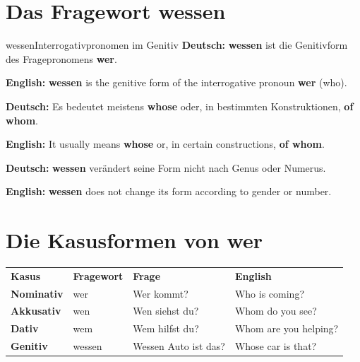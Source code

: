 \documentclass[a4paper,11pt]{article}
\newcommand{\GermanText}[1]{\textbf{Deutsch: }#1\par}
\newcommand{\EnglishText}[1]{{\small\color{SoftGray}\textbf{English: }#1\par}}
\begin{document}
    
    \section{Das Fragewort \glqq wessen\grqq}
        
        \begin{grammarentry}{wessen}{Interrogativpronomen im Genitiv}
            \GermanText{\textbf{wessen} ist die Genitivform des Fragepronomens \textbf{wer}.}
            \EnglishText{\textbf{wessen} is the genitive form of the interrogative pronoun \textbf{wer} (who).}
            
            \GermanText{Es bedeutet meistens \textbf{whose} oder, in bestimmten Konstruktionen, \textbf{of whom}.}
            \EnglishText{It usually means \textbf{whose} or, in certain constructions, \textbf{of whom}.}
            
            \GermanText{\textbf{wessen} verändert seine Form nicht nach Genus oder Numerus.}
            \EnglishText{\textbf{wessen} does not change its form according to gender or number.}
        \end{grammarentry}
    
    
    \section{Die Kasusformen von \glqq wer\grqq}
        
        \begin{longtable}{>{\bfseries}p{3.2cm}|p{3.0cm}|p{4.5cm}|p{3.2cm}}
            \rowcolor{HeaderBlueDark}
            \color{white}\textbf{Kasus} &
            \color{white}\textbf{Fragewort} &
            \color{white}\textbf{Frage} &
            \color{white}\textbf{English} \\
            
            Nominativ &
            wer &
            Wer kommt? &
            Who is coming? \\
            
            Akkusativ &
            wen &
            Wen siehst du? &
            Whom do you see? \\
            
            Dativ &
            wem &
            Wem hilfst du? &
            Whom are you helping? \\
            
            Genitiv &
            wessen &
            Wessen Auto ist das? &
            Whose car is that? \\
        \end{longtable}
    
\end{document}
